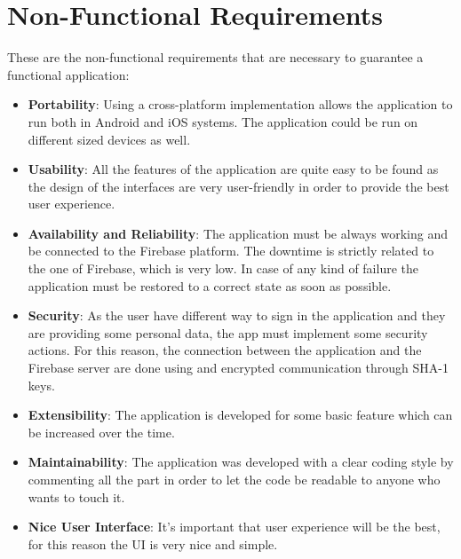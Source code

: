 \section{Non-Functional Requirements}
	These are the non-functional requirements that are necessary to guarantee a functional application:

\begin{itemize}
	\item \textbf{Portability}: Using a cross-platform implementation allows the application to run both in Android and iOS systems. The application could be run on different sized devices as well.
	
	\item \textbf{Usability}: All the features of the application are quite easy to be found as the design of the interfaces are very user-friendly in order to provide the best user experience.
	
	\item \textbf{Availability and Reliability}: The application must be always working and be connected to the Firebase platform.
	The downtime is strictly related to the one of Firebase, which is very low.
	In case of any kind of failure the application must be restored to a correct state as soon as possible.
	
	\item \textbf {Security}: As the user have different way to sign in the application and they are providing some personal data, the app must implement some security actions. For this reason, the connection between the application and the Firebase server are done using and encrypted communication through SHA-1 keys.
	
	\item \textbf{Extensibility}: The application is developed for some basic feature which can be increased over the time.
	
	\item \textbf{Maintainability}: The application was developed with a clear coding style by commenting all the part in order to let the code be readable to anyone who wants to touch it.
	
	\item \textbf{Nice User Interface}: It's important that user experience will be the best, for this reason the UI is very nice and simple.
\end{itemize}
